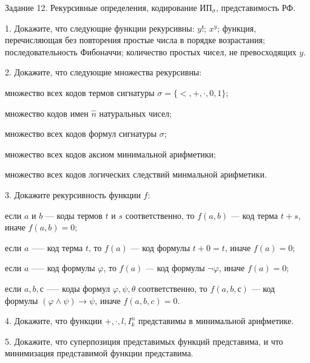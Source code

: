 
\begin{center}
Задание 12. Рекурсивные определения, кодирование ИП$_\sigma$,  представимость РФ. 
\end{center}

1. Докажите, что следующие функции рекурсивны: $y!$; $x^y$; функция, перечисляющая без повторения простые числа в порядке возрастания; последовательность Фибоначчи; количество простых чисел, не превосходящих $y$. 
\medskip

2. Докажите, что следующие множества рекурсивны: 

множество всех кодов термов сигнатуры $\sigma=\{<,+,\cdot,0,1\}$; 

множество кодов имен $\hat{n}$ натуральных чисел; 

множество всех кодов формул сигнатуры $\sigma$;

множество всех кодов аксиом минимальной арифметики;

множество всех кодов логических следствий минмальной арифметики. 
\medskip

3. Докажите рекурсивность функции $f$:

 если $a$ и $b$ — коды термов $t$ и $s$ соответственно, то $f (a, b)$ --- код терма $t + s$, иначе $f (a, b) = 0$;

если $a$ --— код терма $t$, то $f (a)$ --- код формулы $t + 0 = t$, иначе $f (a) = 0$;

если $a$ --— код формулы $\varphi$, то $f (a)$ --- код формулы $\neg\varphi$, иначе $f (a) = 0$;

если $a, b, с$ --— коды формул $\varphi, \psi, \theta$ соответственно, то $f (a, b, с)$ --- код формулы $(\varphi\wedge\psi)\to\psi$, иначе $f (a, b, c) = 0$.
\medskip

4. Докажите, что функции $+,\cdot,l,I^n_k$ представимы в минимальной арифметике.
\medskip

5. Докажите, что суперпозиция представимых функций представима, и что минимизация представимой функции представима.









